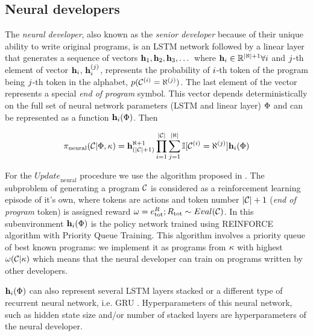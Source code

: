 \newpage \subsection{Neural developers}
\label{sec:neural}

The \emph{neural developer}, also known as the \emph{senior developer} because of their unique ability to write original programs, is an LSTM \cite{hochreiterLongShorttermMemory1997} network followed by a linear layer that generates a sequence of vectors $\mathbf{h}_{1},\mathbf{h}_{2},\mathbf{h}_{3},\dots$ where $\mathbf{h}_i \in \mathbb{R}^{|\aleph| + 1} \forall i$ and $j$-th element of vector $\mathbf{h}_i$, $\mathbf{h}_i^{(j)}$, represents the probability of $i$-th token of the program being $j$-th token in the alphabet, $p(\mathcal{C}^{(i)}=\aleph^{(j)})$.
The last element of the vector represents a special \emph{end of program} symbol.
This vector depends deterministically on the full set of neural network parameters (LSTM and linear layer) $\Phi$ and can be represented as a function $\mathbf{h}_i(\Phi)$.
Then

\begin{equation}
    \pi_\text{neural}(\mathcal{C} | \Phi, \kappa) = \mathbf{h}_{(|\mathcal{C}|+1)}^{\aleph+1}
    \prod\limits_{i=1}^{|\mathcal{C}|}
    \sum\limits_{j=1}^{|\aleph|} \mathbb{I}[\mathcal{C}^{(i)}=\aleph^{(j)}]
    \mathbf{h}_i(\Phi)
\end{equation}

For the $\mathit{Update}_\text{neural}$ procedure we use the algorithm proposed in \cite{abolafiaNeuralProgramSynthesis2018}.
The subproblem of generating a program $\mathcal{C}$ is considered as a reinforcement learning episode of it's own, where tokens are actions and token number $|\mathcal{C}|+1$ (\emph{end of program} token) is assigned reward $\omega = e^R_\text{tot}; R_\text{tot} \sim Eval(\mathcal{C})$. 
In this subenvironment $\mathbf{h}_i(\Phi)$ is the policy network \cite[chapter 13]{suttonReinforcementLearningSecond2018} trained using REINFORCE algorithm with Priority Queue Training.
This algorithm involves a priority queue of best known programs: we implement it as programs from $\kappa$ with highest $\omega(\mathcal{C}|\kappa)$ which means that the neural developer can train on programs written by other developers.

$\mathbf{h}_i(\Phi)$ can also represent several LSTM layers stacked or a different type of recurrent neural network, i.e. GRU \cite{choPropertiesNeuralMachine2014,chung2014empirical}.
Hyperparameters of this neural network, such as hidden state size and/or number of stacked layers are hyperparameters of the neural developer.  

